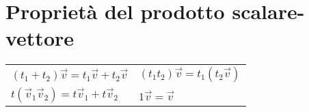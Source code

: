 \section{Proprietà del prodotto scalare-vettore}
\begin{tabular}{ll}
	$(t_1+t_2)\vec{v} = t_1\vec{v} + t_2\vec{v}$ & $(t_1t_2)\vec{v} = t_1(t_2\vec{v})$ \\
	$t(\vec{v}_1\vec{v}_2) = t\vec{v}_1 + t\vec{v}_2$ & $1\vec{v} = \vec{v}$
\end{tabular}